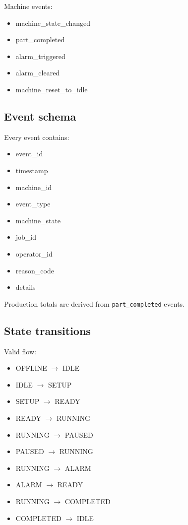 \documentclass[11pt]{article}
\begin{document}
Machine events:
\begin{itemize}
\item machine\_state\_changed
\item part\_completed
\item alarm\_triggered
\item alarm\_cleared
\item machine\_reset\_to\_idle
\end{itemize}

\subsection{Event schema}
Every event contains:
\begin{itemize}
\item event\_id
\item timestamp
\item machine\_id
\item event\_type
\item machine\_state
\item job\_id
\item operator\_id
\item reason\_code
\item details
\end{itemize}

Production totals are derived from \texttt{part\_completed} events.

\subsection{State transitions}
Valid flow:
\begin{itemize}
\item OFFLINE $\rightarrow$ IDLE
\item IDLE $\rightarrow$ SETUP
\item SETUP $\rightarrow$ READY
\item READY $\rightarrow$ RUNNING
\item RUNNING $\rightarrow$ PAUSED
\item PAUSED $\rightarrow$ RUNNING
\item RUNNING $\rightarrow$ ALARM
\item ALARM $\rightarrow$ READY
\item RUNNING $\rightarrow$ COMPLETED
\item COMPLETED $\rightarrow$ IDLE
\end{itemize}
\end{document}
